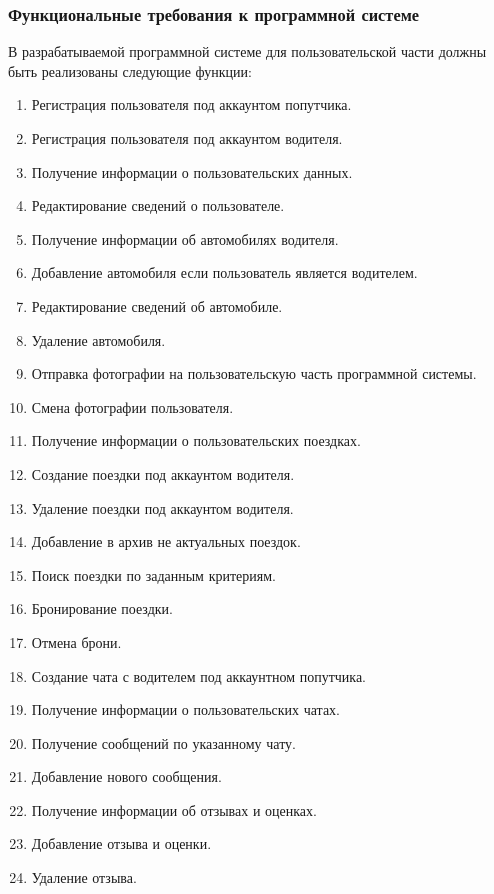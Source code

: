 \subsubsection{Функциональные требования к программной системе}

В разрабатываемой программной системе для пользовательской части должны быть реализованы следующие функции:

\begin{enumerate}
	\item Регистрация пользователя под аккаунтом попутчика. 
	\item Регистрация пользователя под аккаунтом водителя.
	\item Получение информации о пользовательских данных.
	\item Редактирование сведений о пользователе.
	\item Получение информации об автомобилях водителя.
	\item Добавление автомобиля если пользователь является водителем.
	\item Редактирование сведений об автомобиле.
	\item Удаление автомобиля.
	\item Отправка фотографии на пользовательскую часть программной системы.
	\item Смена фотографии пользователя.
	\item Получение информации о пользовательских поездках.
	\item Создание поездки под аккаунтом водителя.
	\item Удаление поездки под аккаунтом водителя.
	\item Добавление в архив не актуальных поездок.
	\item Поиск поездки по заданным критериям.
	\item Бронирование поездки.
	\item Отмена брони.
	\item Создание чата с водителем под аккаунтном попутчика.
	\item Получение информации о пользовательских чатах.
	\item Получение сообщений по указанному чату.
	\item Добавление нового сообщения.
	\item Получение информации об отзывах и оценках.
	\item Добавление отзыва и оценки.
	\item Удаление отзыва.
\end{enumerate}

